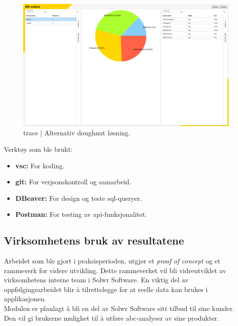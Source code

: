 \begin{figure}[H]
\centering
\includegraphics[width=0.8\linewidth]{resources/java app/abc_analysis_trace_insight_my_attempt.png}
\caption{\label{fig:abc_analysis_trace_insight_my_attempt}\gls{trace} | Alternativ doughnut løsning.}
\end{figure}

Verktøy som ble brukt:
\begin{itemize}
    \item \textbf{\gls{vsc}:} For koding.
    \item \textbf{\Gls{git}:} For verjsonskontroll og samarbeid.
    \item \textbf{DBeaver:} For design og teste \gls{sql}-queryer.
    \item \textbf{Postman:} For testing av \gls{api}-funksjonalitet.
\end{itemize}

\subsection{Virksomhetens bruk av resultatene}
% 


Arbeidet som ble gjort i praksisperioden, utgjør et \textit{proof of concept} og et rammeverk for videre utvikling. Dette rammeverket vil bli vidreutviklet av virksomhetens interne team i Solwr Software. En viktig del av oppfølgingsarbeidet blir å tilrettelegge for at reelle data kan brukes i applikasjonen.\\
Modulen er planlagt å bli en del av Solwr Software sitt tilbud til sine kunder. Den vil gi brukerne mulighet til å utføre \gls{abc}-analyser av sine produkter.

